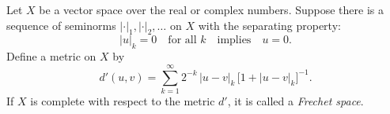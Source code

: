 Let $X$ be a vector space over the real or complex numbers. Suppose there is a sequence of seminorms $|\cdot|_1, |\cdot|_2, \ldots$ on $X$ with the separating property:
$$|u|_k = 0 \quad \text{for all } k \quad \text{implies} \quad u = 0.$$
Define a metric on $X$ by
$$d'(u, v) = \sum_{k=1}^{\infty} 2^{-k} \, |u - v|_k \, \bigl[1 + |u - v|_k\bigr]^{-1}.$$
If $X$ is complete with respect to the metric $d'$, it is called a \emph{Frechet space}.
